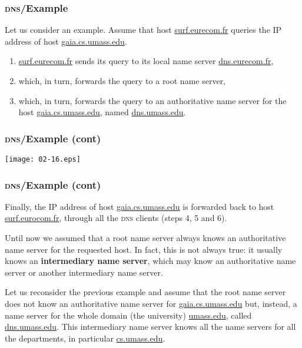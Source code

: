 %
\begin{frame}
\frametitle{\textsc{dns}/Example}

Let us consider an example. Assume that host \url{surf.eurecom.fr}
queries the IP address of host \url{gaia.cs.umass.edu}.
\begin{enumerate}
  \item \url{surf.eurecom.fr} sends its query to its local name server
    \url{dns.eurecom.fr},

  \item which, in turn, forwards the query to a root name server,

  \item which, in turn, forwards the query to an authoritative name
    server for the host \url{gaia.cs.umass.edu}, named
    \url{dns.umass.edu}.
\end{enumerate}

\end{frame}

%
\begin{frame}
\frametitle{\textsc{dns}/Example (cont)}

\begin{center}
  \texttt{[image: 02-16.eps]}
\end{center}

\end{frame}

%
\begin{frame}
\frametitle{\textsc{dns}/Example (cont)}

Finally, the IP address of host \url{gaia.cs.umass.edu} is forwarded
back to host \url{surf.eurocom.fr}, through all the \textsc{dns}
clients (steps 4, 5 and 6).

Until now we assumed that a root name server always knows an
authoritative name server for the requested host. In fact, this is not
always true: it usually knows an \textbf{intermediary name server},
which may know an authoritative name server or another intermediary
name server.

Let us reconsider the previous example and assume that the root name
server does not know an authoritative name server for
\url{gaia.cs.umass.edu} but, instead, a name server for the whole
domain (the university) \url{umass.edu}, called
\url{dns.umass.edu}. This intermediary name server knows all the name
servers for all the departments, in particular \url{cs.umass.edu}.

\end{frame}

